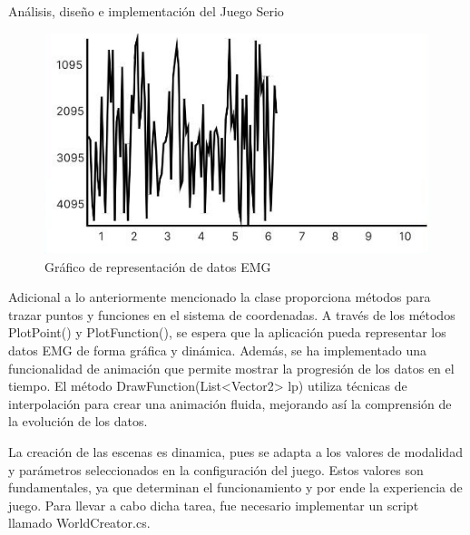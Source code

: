 \begin{thesischapter}{2} {Análisis, diseño e implementación del Juego Serio}
    \begin{figure}[ht]
        \centering
        \includegraphics[scale=0.38]{images/graph.png}
        \caption{Gráfico de representación de datos EMG}
        \label{fig: graph-emg}
    \end{figure}

    \vspace{10pt}
    Adicional a lo anteriormente mencionado la clase proporciona métodos para trazar puntos y funciones en el sistema de coordenadas. A través de los métodos PlotPoint() y PlotFunction(), se espera que la 
    aplicación pueda representar los datos EMG de forma gráfica y dinámica. Además, se ha implementado una funcionalidad de animación que permite mostrar la progresión de los datos en el tiempo. El método 
    DrawFunction(List<Vector2> lp) utiliza técnicas de interpolación para crear una animación fluida, mejorando así la comprensión de la evolución de los datos.

    
    La creación de las escenas es dinamica, pues se adapta a los valores de 
    modalidad y parámetros seleccionados en la configuración del juego. Estos valores son fundamentales, ya que 
    determinan el funcionamiento y por ende la experiencia de juego. Para llevar a cabo dicha tarea, fue necesario implementar un script 
    llamado WorldCreator.cs.


\end{thesischapter}
